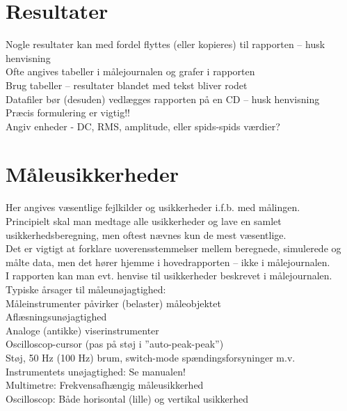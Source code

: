 \section{Resultater}
\label{mic_output_resultater}
Nogle resultater kan med fordel flyttes (eller kopieres) til rapporten – husk henvisning \\
Ofte angives tabeller i målejournalen og grafer i rapporten \\
Brug tabeller – resultater blandet med tekst bliver rodet\\
Datafiler bør (desuden) vedlægges rapporten på en CD – husk henvisning\\
Præcis formulering er vigtig!!\\
Angiv enheder - DC, RMS, amplitude, eller spids-spids værdier?\\

\section{Måleusikkerheder}
\label{mic_output_maaleusikkerheder}
Her angives væsentlige fejlkilder og usikkerheder i.f.b. med målingen. \\
Principielt skal man medtage alle usikkerheder og lave en samlet usikkerhedsberegning, men oftest nævnes kun de mest væsentlige. \\
Det er vigtigt at forklare uoverensstemmelser mellem beregnede, simulerede og målte data, men det hører hjemme i hovedrapporten – ikke i målejournalen. \\
I rapporten kan man evt. henvise til usikkerheder beskrevet i målejournalen.\\
Typiske årsager til måleunøjagtighed:\\
Måleinstrumenter påvirker (belaster) måleobjektet\\
Aflæsningsunøjagtighed\\
Analoge (antikke) viserinstrumenter	\\
Oscilloscop-cursor (pas på støj i ”auto-peak-peak”)\\
Støj, 50 Hz (100 Hz) brum, switch-mode spændingsforsyninger m.v.\\
Instrumentets unøjagtighed: Se manualen! \\
Multimetre: Frekvensafhængig måleusikkerhed \\
Oscilloscop: Både horisontal (lille) og vertikal usikkerhed\\

